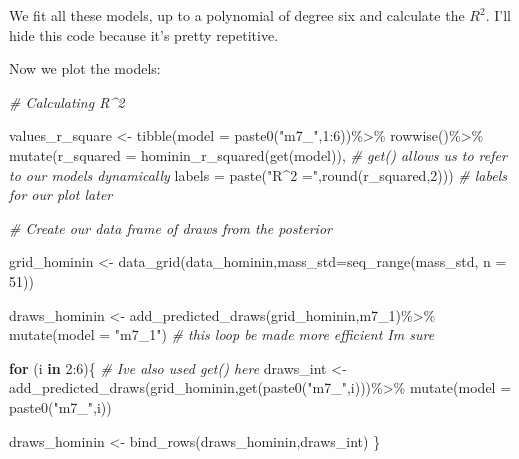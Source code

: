 \documentclass[
]{book}
\newenvironment{Shaded}{\begin{snugshade}}{\end{snugshade}}
\newcommand{\AttributeTok}[1]{\textcolor[rgb]{0.77,0.63,0.00}{#1}}
\newcommand{\CommentTok}[1]{\textcolor[rgb]{0.56,0.35,0.01}{\textit{#1}}}
\newcommand{\ControlFlowTok}[1]{\textcolor[rgb]{0.13,0.29,0.53}{\textbf{#1}}}
\newcommand{\DecValTok}[1]{\textcolor[rgb]{0.00,0.00,0.81}{#1}}
\newcommand{\FunctionTok}[1]{\textcolor[rgb]{0.00,0.00,0.00}{#1}}
\newcommand{\NormalTok}[1]{#1}
\newcommand{\OtherTok}[1]{\textcolor[rgb]{0.56,0.35,0.01}{#1}}
\newcommand{\SpecialCharTok}[1]{\textcolor[rgb]{0.00,0.00,0.00}{#1}}
\newcommand{\StringTok}[1]{\textcolor[rgb]{0.31,0.60,0.02}{#1}}
\begin{document}
We fit all these models, up to a polynomial of degree six and calculate the \(R^2\). I'll hide this code because it's pretty repetitive.

Now we plot the models:

\begin{Shaded}
\begin{Highlighting}[]
\CommentTok{\# Calculating R\^{}2}

\NormalTok{values\_r\_square }\OtherTok{\textless{}{-}} \FunctionTok{tibble}\NormalTok{(}\AttributeTok{model =} \FunctionTok{paste0}\NormalTok{(}\StringTok{"m7\_"}\NormalTok{,}\DecValTok{1}\SpecialCharTok{:}\DecValTok{6}\NormalTok{))}\SpecialCharTok{\%\textgreater{}\%}
  \FunctionTok{rowwise}\NormalTok{()}\SpecialCharTok{\%\textgreater{}\%}
  \FunctionTok{mutate}\NormalTok{(}\AttributeTok{r\_squared =} \FunctionTok{hominin\_r\_squared}\NormalTok{(}\FunctionTok{get}\NormalTok{(model)), }\CommentTok{\# get() allows us to refer to our models dynamically}
         \AttributeTok{labels =} \FunctionTok{paste}\NormalTok{(}\StringTok{"R\^{}2 ="}\NormalTok{,}\FunctionTok{round}\NormalTok{(r\_squared,}\DecValTok{2}\NormalTok{))) }\CommentTok{\# labels for our plot later}

\CommentTok{\# Create our data frame of draws from the posterior}

\NormalTok{grid\_hominin }\OtherTok{\textless{}{-}} \FunctionTok{data\_grid}\NormalTok{(data\_hominin,}\AttributeTok{mass\_std=}\FunctionTok{seq\_range}\NormalTok{(mass\_std, }\AttributeTok{n =} \DecValTok{51}\NormalTok{))}

\NormalTok{draws\_hominin }\OtherTok{\textless{}{-}} \FunctionTok{add\_predicted\_draws}\NormalTok{(grid\_hominin,m7\_1)}\SpecialCharTok{\%\textgreater{}\%}
  \FunctionTok{mutate}\NormalTok{(}\AttributeTok{model =} \StringTok{"m7\_1"}\NormalTok{) }\CommentTok{\# this loop be made more efficient I\textquotesingle{}m sure}
  
\ControlFlowTok{for}\NormalTok{ (i }\ControlFlowTok{in} \DecValTok{2}\SpecialCharTok{:}\DecValTok{6}\NormalTok{)\{}
    \CommentTok{\# I\textquotesingle{}ve also used get() here }
\NormalTok{  draws\_int }\OtherTok{\textless{}{-}} \FunctionTok{add\_predicted\_draws}\NormalTok{(grid\_hominin,}\FunctionTok{get}\NormalTok{(}\FunctionTok{paste0}\NormalTok{(}\StringTok{"m7\_"}\NormalTok{,i)))}\SpecialCharTok{\%\textgreater{}\%} 
    \FunctionTok{mutate}\NormalTok{(}\AttributeTok{model =} \FunctionTok{paste0}\NormalTok{(}\StringTok{"m7\_"}\NormalTok{,i))}
  
\NormalTok{  draws\_hominin }\OtherTok{\textless{}{-}} \FunctionTok{bind\_rows}\NormalTok{(draws\_hominin,draws\_int)}
\NormalTok{\}}
  


\end{Highlighting}
\end{Shaded}
\end{document}
